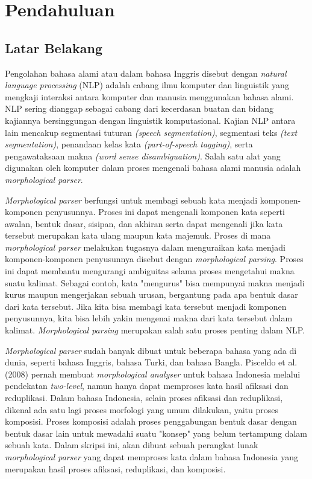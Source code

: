 \chapter{Pendahuluan}
\label{chap:pendahuluan}

\section{Latar Belakang}
\label{sec:latarBelakang}

Pengolahan bahasa alami atau dalam bahasa Inggris disebut dengan {\it natural language processing} (NLP) adalah cabang ilmu komputer dan linguistik yang mengkaji interaksi antara komputer dan manusia menggunakan bahasa alami. NLP sering dianggap sebagai cabang dari kecerdasan buatan dan bidang kajiannya bersinggungan dengan linguistik komputasional. Kajian NLP antara lain mencakup segmentasi tuturan {\it (speech segmentation)}, segmentasi teks {\it (text segmentation)}, penandaan kelas kata {\it (part-of-speech tagging)}, serta pengawataksaan makna {\it (word sense disambiguation)}. Salah satu alat yang digunakan oleh komputer dalam proses mengenali bahasa alami manusia adalah {\it morphological parser}.

{\it Morphological parser} berfungsi untuk membagi sebuah kata menjadi komponen-komponen penyusunnya. Proses ini dapat mengenali komponen kata seperti awalan, bentuk dasar, sisipan, dan akhiran serta dapat mengenali jika kata tersebut merupakan kata ulang maupun kata majemuk. Proses di mana {\it morphological parser} melakukan tugasnya dalam menguraikan kata menjadi komponen-komponen penyusunnya disebut dengan {\it morphological parsing}. Proses ini dapat membantu mengurangi ambiguitas selama proses mengetahui makna suatu kalimat. Sebagai contoh, kata "mengurus" bisa mempunyai makna menjadi kurus maupun mengerjakan sebuah urusan, bergantung pada apa bentuk dasar dari kata tersebut. Jika kita bisa membagi kata tersebut menjadi komponen penyusunnya, kita bisa lebih yakin mengenai makna dari kata tersebut dalam kalimat. {\it Morphological parsing} merupakan salah satu proses penting dalam NLP.

{\it Morphological parser} sudah banyak dibuat untuk beberapa bahasa yang ada di dunia, seperti bahasa Inggris, bahasa Turki, dan bahasa Bangla. Pisceldo et al. (2008) pernah membuat \textit{morphological analyser} untuk bahasa Indonesia melalui pendekatan \textit{two-level}, namun hanya dapat memproses kata hasil afiksasi dan reduplikasi. Dalam bahasa Indonesia, selain proses afiksasi dan reduplikasi, dikenal ada satu lagi proses morfologi yang umum dilakukan, yaitu proses komposisi. Proses komposisi adalah proses penggabungan bentuk dasar dengan bentuk dasar lain untuk mewadahi suatu "konsep" yang belum tertampung dalam sebuah kata\cite{chaer:08:morfologi}. Dalam skripsi ini, akan dibuat sebuah perangkat lunak {\it morphological parser} yang dapat memproses kata dalam bahasa Indonesia yang merupakan hasil proses afiksasi, reduplikasi, dan komposisi.

